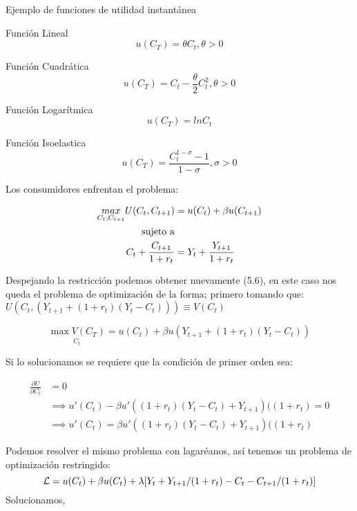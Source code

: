 Ejemplo de funciones de utilidad instantánea

Función Lineal
\begin{equation}
    u(C_{T}) = \theta C_{t}, \theta>0
\end{equation}

Función Cuadrática
\begin{equation}
    u(C_{T}) =C_{t}-\frac{\theta}{2}C^{2}_{t}, \theta>0
\end{equation}

Función Logarítmica
\begin{equation}
    u(C_{T}) =ln C_{t}
\end{equation}

Función Isoelastica
\begin{equation}
    u(C_{T}) =\frac{C_{t}^{1-\sigma}-1}{1-\sigma}, \sigma>0
\end{equation}

Los consumidores enfrentan el problema: 

\begin{align}
    \underset{C_{t}, C_{t+1}}{max} U(C_{t}, C_{t+1})&= u(C_{t})+ \beta u(C_{t+1})\\
    \textup{sujeto a} &\nonumber\\
    C_{t}+\frac{C_{t+1}}{1+r_{t}} &= Y_{t}+\frac{Y_{t+1}}{1+r_{t}}
\end{align}

Despejando la restricción podemos obtener nuevamente (5.6), en este caso nos queda el problema de optimización de la forma; primero tomando que: $U(C_{t}, (Y_{t+1} + (1+r_{t})(Y_{t}-C_{t}))) \equiv V(C_{t})$

\begin{equation}
    \underset{C_{t}}{\max{V(C_{T})}}  = u(C_{t})+\beta u(Y_{t+1} + (1+r_{t})(Y_{t}-C_{t}))
\end{equation}

Si lo solucionamos se requiere que la condición de primer orden sea: 

\begin{align}
    \frac{\partial U}{\partial C_{t}} &= 0 \\
    & \implies u'(C_{t}) - \beta u'((1+r_{t})(Y_{t}-C_{t})+Y_{t+1})((1+r_{t}) = 0\\
    & \implies  u'(C_{t}) = \beta u'((1+r_{t})(Y_{t}-C_{t})+Y_{t+1})((1+r_{t}) 
\end{align}

Podemos resolver el mismo problema con lagaréanos, así tenemos un problema de optimización restringido:
\begin{equation}
    {\cal L} = u(C_{t})+\beta u(C_{t})+\lambda[Y_{t}+Y_{t+1}/(1+r_{t})-C_{t}-C_{t+1}/(1+r_{t})]
\end{equation}
Solucionamos, 

